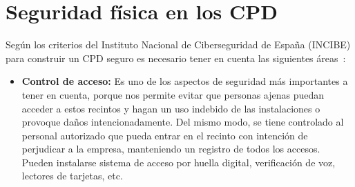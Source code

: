 \section{Seguridad física en los CPD}\label{sec:seguridad_fisica_CPD}
Según los criterios del Instituto Nacional de Ciberseguridad de España (INCIBE) para construir un CPD seguro es necesario tener en cuenta las siguientes áreas~\cite{instituto_nacional_de_ciberseguridad_de_espana_pon_2015}:
\begin{itemize}
	\item \textbf{Control de acceso:} Es uno de los aspectos de seguridad más importantes a tener en cuenta, porque nos permite evitar que personas ajenas puedan acceder a estos recintos y hagan un uso indebido de las instalaciones o provoque daños intencionadamente. Del mismo modo, se tiene controlado al personal autorizado que pueda entrar en el recinto con intención de perjudicar a la empresa, manteniendo un registro de todos los accesos. Pueden instalarse sistema de acceso por huella digital, verificación de voz, lectores de tarjetas, etc.


\end{itemize}

